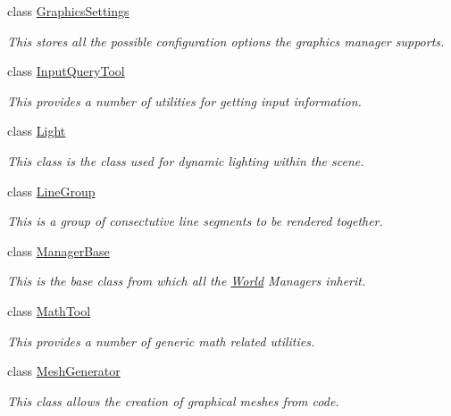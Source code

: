 \begin{DoxyCompactItemize}
class \hyperlink{structphys_1_1GraphicsSettings}{GraphicsSettings}
\begin{DoxyCompactList}\small\item\em This stores all the possible configuration options the graphics manager supports. \item\end{DoxyCompactList}\item 
class \hyperlink{classphys_1_1InputQueryTool}{InputQueryTool}
\begin{DoxyCompactList}\small\item\em This provides a number of utilities for getting input information. \item\end{DoxyCompactList}\item 
class \hyperlink{classphys_1_1Light}{Light}
\begin{DoxyCompactList}\small\item\em This class is the class used for dynamic lighting within the scene. \item\end{DoxyCompactList}\item 
class \hyperlink{classphys_1_1LineGroup}{LineGroup}
\begin{DoxyCompactList}\small\item\em This is a group of consectutive line segments to be rendered together. \item\end{DoxyCompactList}\item 
class \hyperlink{classphys_1_1ManagerBase}{ManagerBase}
\begin{DoxyCompactList}\small\item\em This is the base class from which all the \hyperlink{classphys_1_1World}{World} Managers inherit. \item\end{DoxyCompactList}\item 
class \hyperlink{classphys_1_1MathTool}{MathTool}
\begin{DoxyCompactList}\small\item\em This provides a number of generic math related utilities. \item\end{DoxyCompactList}\item 
class \hyperlink{classphys_1_1MeshGenerator}{MeshGenerator}
\begin{DoxyCompactList}\small\item\em This class allows the creation of graphical meshes from code. \item\end{DoxyCompactList}\item 

\end{DoxyCompactItemize}
